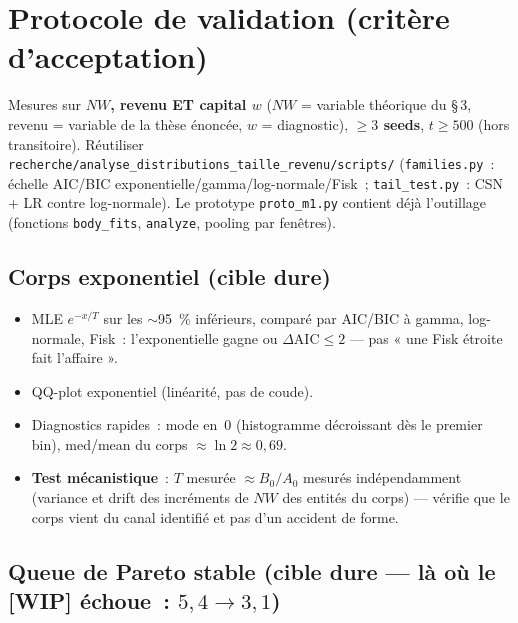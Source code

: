 \documentclass[11pt,a4paper]{article}
\newcommand{\NW}{\mathit{NW}}
\begin{document}
\section{Protocole de validation (critère d'acceptation)}
\label{sec:protocole}

Mesures sur \textbf{$\NW$, revenu ET capital $w$} ($\NW$ = variable théorique du \S\,3, revenu = variable de la thèse énoncée, $w$ = diagnostic), \textbf{$\geq 3$ seeds}, $t\geq 500$ (hors transitoire). Réutiliser \texttt{recherche/analyse_distributions_taille_revenu/scripts/} (\texttt{families.py}~: échelle AIC/BIC exponentielle/gamma/log-normale/Fisk~; \texttt{tail_test.py}~: CSN + LR contre log-normale). Le prototype \texttt{proto_m1.py} contient déjà l'outillage (fonctions \texttt{body_fits}, \texttt{analyze}, pooling par fenêtres).

\subsection{Corps exponentiel (cible dure)}
\label{sec:corps-exp}

\begin{itemize}
  \item MLE $e^{-x/T}$ sur les $\sim$95~\% inférieurs, comparé par AIC/BIC à gamma, log-normale, Fisk~: l'exponentielle gagne ou $\Delta\mathrm{AIC}\leq 2$ --- pas « une Fisk étroite fait l'affaire ».
  \item QQ-plot exponentiel (linéarité, pas de coude).
  \item Diagnostics rapides~: mode en~0 (histogramme décroissant dès le premier bin), med/mean du corps $\approx \ln 2 \approx 0{,}69$.
  \item \textbf{Test mécanistique}~: $T$ mesurée $\approx B_0/A_0$ mesurés indépendamment (variance et drift des incréments de $\NW$ des entités du corps) --- vérifie que le corps vient du canal identifié et pas d'un accident de forme.
\end{itemize}

\subsection{Queue de Pareto stable (cible dure --- là où le [WIP] échoue~: $5{,}4\to 3{,}1$)}
\label{sec:queue-pareto}
\end{document}
